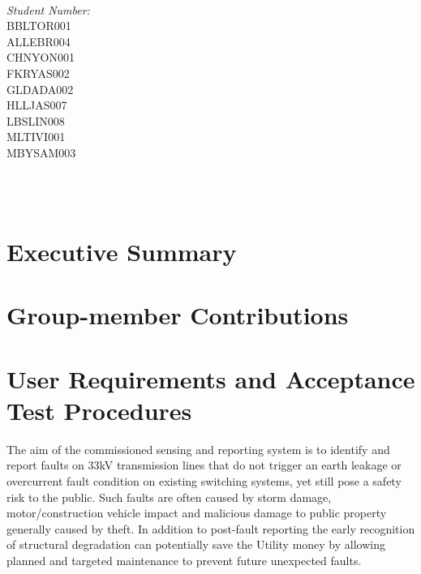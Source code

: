 \documentclass[12pt]{article}
\makeatletter
\let\thedate\@date
\makeatother
\begin{document}
\begin{titlepage}
\begin{minipage}{0.4\textwidth}
\begin{flushleft}
			\end{flushleft}
			\end{minipage}~
			\begin{minipage}{0.4\textwidth}
			\begin{flushright} \large
			\emph{Student Number:} \\
      BBLTOR001\\
      ALLEBR004\\
      CHNYON001\\
      FKRYAS002\\
      GLDADA002\\
      HLLJAS007\\
      LBSLIN008\\
      MLTIVI001\\
      MBYSAM003\\									%
		\end{flushright}
	\end{minipage}\\[0.5 cm]
	
	{\large \thedate}\\[0.5 cm]
 
	\vfill
	
\end{titlepage}


\tableofcontents
\pagebreak


\section{Executive Summary}

\section{Group-member Contributions}
\newpage
\section{User Requirements and Acceptance Test Procedures}

The aim of the commissioned sensing and reporting system is to identify and report faults on 33kV transmission lines 
that do not trigger an earth leakage or overcurrent fault condition on existing switching systems, yet still pose 
a safety risk to the public. Such faults are often caused by storm damage, motor/construction vehicle impact and 
malicious damage to public property generally caused by theft. In addition to post-fault reporting the early recognition
of structural degradation can potentially save the Utility money by allowing planned and targeted maintenance to prevent 
future unexpected faults.
\end{document}
